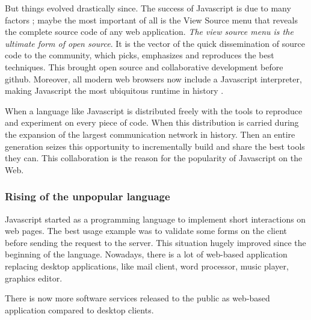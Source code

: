 But things evolved drastically since.
The success of Javascript is due to many factors ; maybe the most important of all is the View Source menu that reveals the complete source code of any web application.
\textit{The view source menu is the ultimate form of open source}.
It is the vector of the quick dissemination of source code to the community, which picks, emphasizes and reproduces the best techniques.
This brought open source and collaborative development before github. 
Moreover, all modern web browsers now include a Javascript interpreter, making Javascript the most ubiquitous runtime in history \cite{Flanagan2006}.

When a language like Javascript is distributed freely with the tools to reproduce and experiment on every piece of code.
When this distribution is carried during the expansion of the largest communication network in history.
Then an entire generation seizes this opportunity to incrementally build and share the best tools they can.
This collaboration is the reason for the popularity of Javascript on the Web.

\subsubsection{Rising of the unpopular language}


Javascript started as a programming language to implement short interactions on web pages.
The best usage example was to validate some forms on the client before sending the request to the server.
This situation hugely improved since the beginning of the language.
Nowadays, there is a lot of web-based application replacing desktop applications, like mail client, word processor, music player, graphics editor.

There is now more software services released to the public as web-based application compared to desktop clients.

